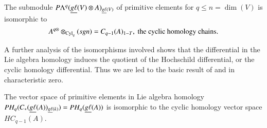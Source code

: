 \begin{proposition}\label{chap4-prop5.5}
The submodule $P\Lambda^{q}(\underline{g\ell}(V)\otimes A)_{\underline{g\ell}(V)}$
of primitive elements for $q\leq n=\dim(V)$ is isomorphic to 
$$
A^{q\otimes}\otimes_{\operatorname{Cyl}_{q}}(sgn)=C_{q-1}(A)_{1-T},\text{~ the
  cyclic homology chains.}
$$
\end{proposition}

A further analysis of the isomorphisms involved shows that the
differential in the Lie algebra homology induces the quotient of the
Hochs\-child differential, or the cyclic homology differential. Thus we
are led to the basic result of \cite{Tsygan1983} and \cite{Loday1984}
in characteristic zero.

\begin{theorem}\label{chap4-thm5.6}
The vector space of primitive elements in Lie algebra homology
$PH_{q}(C_{\ast}(\underline{g\ell}(A))_{\underline{g\ell}(k)})=PH_{q}(\underline{g\ell}(A))$
is isomorphic to the cyclic homology vector space $HC_{q-1}(A)$. 
\end{theorem}
